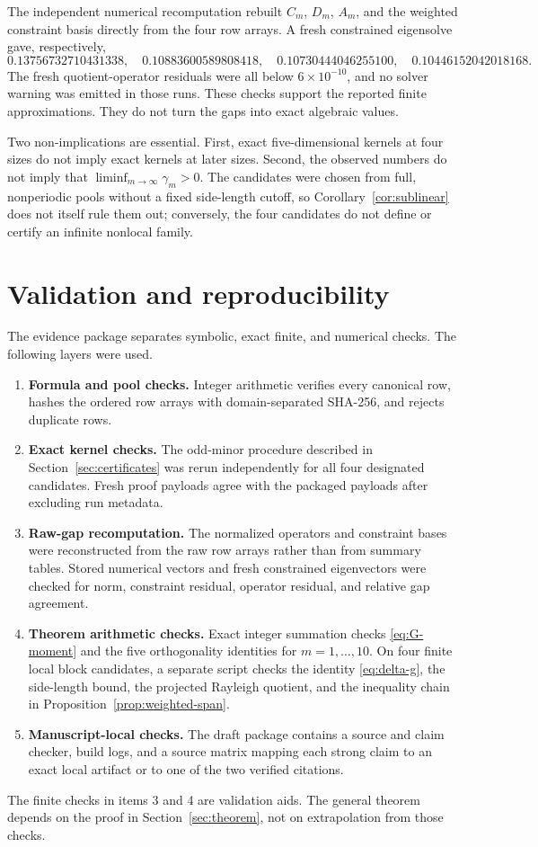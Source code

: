 \documentclass[11pt]{article}
\theoremstyle{definition}
\theoremstyle{remark}
\begin{document}
The independent numerical recomputation rebuilt $C_m$, $D_m$, $A_m$, and the
weighted constraint basis directly from the four row arrays.  A fresh
constrained eigensolve gave, respectively,
\[
 0.13756732710431338,\quad
 0.10883600589808418,\quad
 0.10730444046255100,\quad
 0.10446152042018168.
\]
The fresh quotient-operator residuals were all below $6\times10^{-10}$, and
no solver warning was emitted in those runs.  These checks support the
reported finite approximations.  They do not turn the gaps into exact
algebraic values.

Two non-implications are essential.  First, exact five-dimensional kernels
at four sizes do not imply exact kernels at later sizes.  Second, the observed
numbers do not imply that $\liminf_{m\to\infty}\gamma_m>0$.  The candidates
were chosen from full, nonperiodic pools without a fixed side-length cutoff,
so Corollary~\ref{cor:sublinear} does not itself rule them out; conversely, the
four candidates do not define or certify an infinite nonlocal family.

\section{Validation and reproducibility}\label{sec:validation}

The evidence package separates symbolic, exact finite, and numerical checks.
The following layers were used.
\begin{enumerate}
\item \textbf{Formula and pool checks.}  Integer arithmetic verifies every
canonical row, hashes the ordered row arrays with domain-separated SHA-256,
and rejects duplicate rows.
\item \textbf{Exact kernel checks.}  The odd-minor procedure described in
Section~\ref{sec:certificates} was rerun independently for all four designated
candidates.  Fresh proof payloads agree with the packaged payloads after
excluding run metadata.
\item \textbf{Raw-gap recomputation.}  The normalized operators and
constraint bases were reconstructed from the raw row arrays rather than from
summary tables.  Stored numerical vectors and fresh constrained eigenvectors
were checked for norm, constraint residual, operator residual, and relative
gap agreement.
\item \textbf{Theorem arithmetic checks.}  Exact integer summation checks
\eqref{eq:G-moment} and the five orthogonality identities for $m=1,\ldots,10$.
On four finite local block candidates, a separate script checks the identity
\eqref{eq:delta-g}, the side-length bound, the projected Rayleigh quotient,
and the inequality chain in Proposition~\ref{prop:weighted-span}.
\item \textbf{Manuscript-local checks.}  The draft package contains a source
and claim checker, build logs, and a source matrix mapping each strong claim
to an exact local artifact or to one of the two verified citations.
\end{enumerate}
The finite checks in items 3 and 4 are validation aids.  The general theorem
depends on the proof in Section~\ref{sec:theorem}, not on extrapolation from
those checks.
\end{document}
